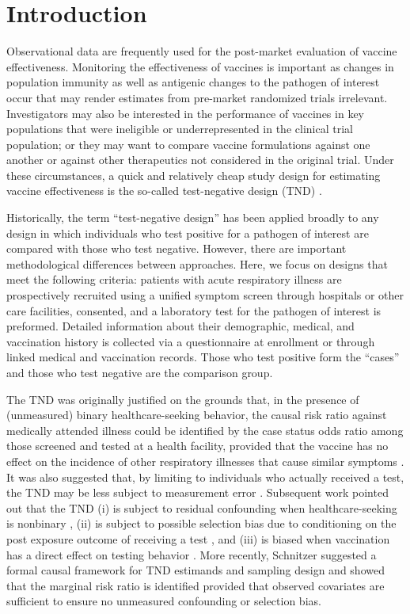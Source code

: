 \documentclass[11pt]{article}
\begin{document}
\doublespacing

\section{Introduction} \label{sec:introduction}
Observational data are frequently used for the post-market evaluation of vaccine effectiveness. Monitoring the effectiveness of vaccines is important as changes in population immunity as well as antigenic changes to the pathogen of interest occur that may render estimates from pre-market randomized trials irrelevant. Investigators may also be interested in the performance of vaccines in key populations that were ineligible or underrepresented in the clinical trial population; or they may want to compare vaccine formulations against one another or against other therapeutics not considered in the original trial. Under these circumstances, a quick and relatively cheap study design for estimating vaccine effectiveness is the so-called test-negative design (TND) \cite{jackson_test-negative_2013}. 
 
Historically, the term ``test-negative design'' has been applied broadly to any design in which individuals who test positive for a pathogen of interest are compared with those who test negative. However, there are important methodological differences between approaches. Here, we focus on designs that meet the following criteria: patients with acute respiratory illness are prospectively recruited using a unified symptom screen through hospitals or other care facilities, consented, and a laboratory test for the pathogen of interest is preformed. Detailed information about their demographic, medical, and vaccination history is collected via a questionnaire at enrollment or through linked medical and vaccination records. Those who test positive form the ``cases'' and those who test negative are the comparison group. 

The TND was originally justified on the grounds that, in the presence of (unmeasured) binary healthcare-seeking behavior, the causal risk ratio against medically attended illness could be identified by the case status odds ratio among those screened and tested at a health facility, provided that the vaccine has no effect on the incidence of other respiratory illnesses that cause similar symptoms \cite{jackson_test-negative_2013}. It was also suggested that, by limiting to individuals who actually received a test, the TND may be less subject to measurement error \cite{jackson_test-negative_2013}. Subsequent work pointed out that the TND (i) is subject to residual confounding when healthcare-seeking is nonbinary \cite{sullivan_theoretical_2016,lewnard_theoretical_2021}, (ii) is subject to possible selection bias due to conditioning on the post exposure outcome of receiving a test \cite{sullivan_theoretical_2016}, and (iii) is biased when vaccination has a direct effect on testing behavior \cite{foppa_case_2013}. More recently, Schnitzer \cite{schnitzer_estimands_2022} suggested a formal causal framework for TND estimands and sampling design and showed that the marginal risk ratio is identified provided that observed covariates are sufficient to ensure no unmeasured confounding or selection bias. 
\end{document}

